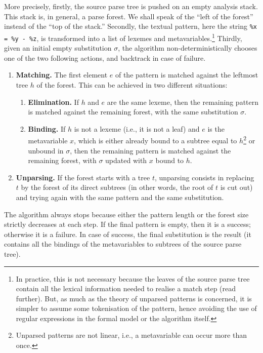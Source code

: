 More precisely, firstly, the source parse tree is pushed on an empty
analysis stack. This stack is, in general, a parse forest. We shall
speak of the ``left of the forest'' instead of the ``top of the
stack.'' Secondly, the textual pattern, here the string \texttt{\%x =
\%y - \%z}, is transformed into a list of lexemes and
meta\-variables.\footnote{In practice, this is not necessary because
the leaves of the source parse tree contain all the lexical
information needed to realise a match step (read further). But, as
much as the theory of unparsed patterns is concerned, it is simpler to
assume some tokenisation of the pattern, hence avoiding the use of
regular expressions in the formal model or the algorithm itself.}
Thirdly, given an initial empty substitution \(\sigma\), the algorithm
non\hyp{}deterministically chooses one of the two following actions,
and backtrack in case of failure.
\begin{enumerate}

  \item \textbf{Matching.} The first element \(e\) of the pattern is
    matched against the leftmost tree \(h\) of the forest. This can be
    achieved in two different situations:
    \begin{enumerate}
    
      \item \textbf{Elimination.} If \(h\) and \(e\) are the same
        lexeme, then the remaining pattern is matched against the
        remaining forest, with the same substitution \(\sigma\).

      \item \textbf{Binding.} If \(h\) is not a lexeme (i.e., it is
        not a leaf) and \(e\) is the meta\-variable \(x\), which is
        either already bound to a subtree equal to
        \(h\)\footnote{Unparsed patterns are not linear, i.e., a
        meta\-variable can occur more than once.} or unbound in
        \(\sigma\), then the remaining pattern is matched against the
        remaining forest, with \(\sigma\) updated with \(x\) bound to
        \(h\).

  \end{enumerate}

  \item \textbf{Unparsing.} If the forest starts with a tree \(t\),
    unparsing consists in replacing \(t\) by the forest of its direct
    subtrees (in other words, the root of \(t\) is cut out) and trying
    again with the same pattern and the same substitution.

\end{enumerate}
The algorithm always stops because either the pattern length or the
forest size strictly decreases at each step. If the final pattern is
empty, then it is a success; otherwise it is a failure. In case of
success, the final substitution is the result (it contains all the
bindings of the meta\-variables to subtrees of the source parse tree).


